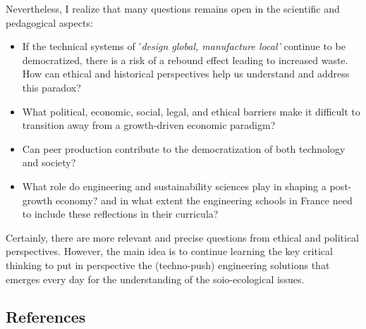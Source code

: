 \documentclass[
  11pt,
  a4paperpaper,
  onecolumn]{article}
\providecommand{\tightlist}{%
  \setlength{\itemsep}{0pt}\setlength{\parskip}{0pt}}\usepackage{longtable,booktabs,array}
\begin{document}
Nevertheless, I realize that many questions remains open in the
scientific and pedagogical aspects:

\begin{itemize}
\tightlist
\item
  If the technical systems of '\emph{design global, manufacture local'}
  continue to be democratized, there is a risk of a rebound effect
  leading to increased waste. How can ethical and historical
  perspectives help us understand and address this paradox?
\item
  What political, economic, social, legal, and ethical barriers make it
  difficult to transition away from a growth-driven economic paradigm?
\item
  Can peer production contribute to the democratization of both
  technology and society?
\item
  What role do engineering and sustainability sciences play in shaping a
  post-growth economy? and in what extent the engineering schools in
  France need to include these reflections in their curricula?
\end{itemize}

Certainly, there are more relevant and precise questions from ethical
and political perspectives. However, the main idea is to continue
learning the key critical thinking to put in perspective the
(techno-push) engineering solutions that emerges every day for the
understanding of the soio-ecological issues.

\newpage

\subsection*{References}\label{references}
\end{document}
